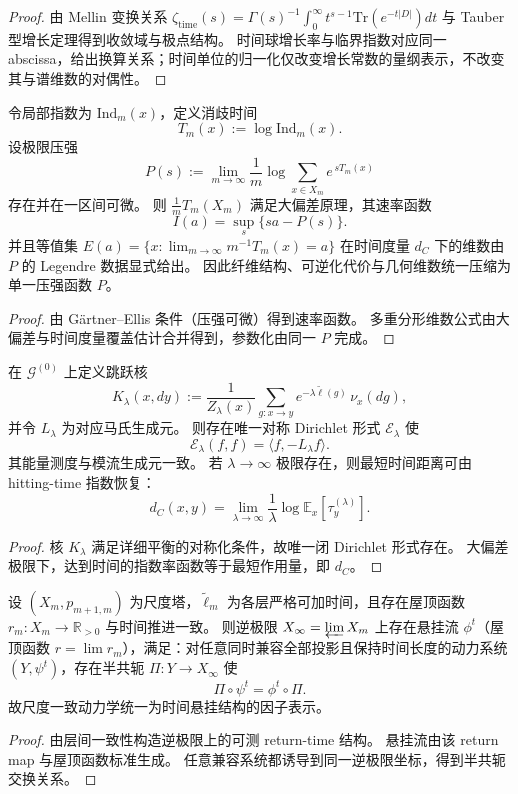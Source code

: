 \begin{proof}
由 Mellin 变换关系
\(
\zeta_{\mathrm{time}}(s)=\Gamma(s)^{-1}\int_0^\infty t^{s-1}\mathrm{Tr}(e^{-t|D|})dt
\)
与 Tauber 型增长定理得到收敛域与极点结构。
时间球增长率与临界指数对应同一 abscissa，给出换算关系；时间单位的归一化仅改变增长常数的量纲表示，不改变其与谱维数的对偶性。
\end{proof}



\begin{theorem}\label{thm:xi-fiber-time-multifractal-legendre}
令局部指数为 \(\mathrm{Ind}_m(x)\)，定义消歧时间
\[
T_m(x):=\log \mathrm{Ind}_m(x).
\]
设极限压强
\[
P(s):=\lim_{m\to\infty}\frac1m\log\sum_{x\in X_m}e^{\,sT_m(x)}
\]
存在并在一区间可微。
则 \(\frac1mT_m(X_m)\) 满足大偏差原理，其速率函数
\[
I(a)=\sup_s\{sa-P(s)\}.
\]
并且等值集
\(
E(a)=\{x:\lim_{m\to\infty}m^{-1}T_m(x)=a\}
\)
在时间度量 \(d_C\) 下的维数由 \(P\) 的 Legendre 数据显式给出。
因此纤维结构、可逆化代价与几何维数统一压缩为单一压强函数 \(P\)。
\end{theorem}

\begin{proof}
由 G\"artner--Ellis 条件（压强可微）得到速率函数。
多重分形维数公式由大偏差与时间度量覆盖估计合并得到，参数化由同一 \(P\) 完成。
\end{proof}

\begin{theorem}\label{thm:xi-time-induced-dirichlet-form}
在 \(\mathcal G^{(0)}\) 上定义跳跃核
\[
K_\lambda(x,dy)
:=
\frac{1}{Z_\lambda(x)}
\sum_{g:x\to y}
e^{-\lambda\widetilde\ell(g)}\,\nu_x(dg),
\]
并令 \(L_\lambda\) 为对应马氏生成元。
则存在唯一对称 Dirichlet 形式 \(\mathcal E_\lambda\) 使
\[
\mathcal E_\lambda(f,f)=\langle f,-L_\lambda f\rangle.
\]
其能量测度与模流生成元一致。
若 \(\lambda\to\infty\) 极限存在，则最短时间距离可由 hitting-time 指数恢复：
\[
d_C(x,y)
=
\lim_{\lambda\to\infty}
\frac{1}{\lambda}\log\mathbb E_x[\tau_y^{(\lambda)}].
\]
\end{theorem}

\begin{proof}
核 \(K_\lambda\) 满足详细平衡的对称化条件，故唯一闭 Dirichlet 形式存在。
大偏差极限下，达到时间的指数率函数等于最短作用量，即 \(d_C\)。
\end{proof}

\begin{theorem}\label{thm:xi-suspension-flow-universality}
设 \((X_m,p_{m+1,m})\) 为尺度塔，\(\widetilde\ell_m\) 为各层严格可加时间，且存在屋顶函数 \(r_m:X_m\to\mathbb R_{>0}\) 与时间推进一致。
则逆极限 \(X_\infty=\varprojlim X_m\) 上存在悬挂流 \(\phi^t\)（屋顶函数 \(r=\lim r_m\)），满足：对任意同时兼容全部投影且保持时间长度的动力系统 \((Y,\psi^t)\)，存在半共轭 \(\Pi:Y\to X_\infty\) 使
\[
\Pi\circ\psi^t=\phi^t\circ\Pi.
\]
故尺度一致动力学统一为时间悬挂结构的因子表示。
\end{theorem}

\begin{proof}
由层间一致性构造逆极限上的可测 return-time 结构。
悬挂流由该 return map 与屋顶函数标准生成。
任意兼容系统都诱导到同一逆极限坐标，得到半共轭交换关系。
\end{proof}
